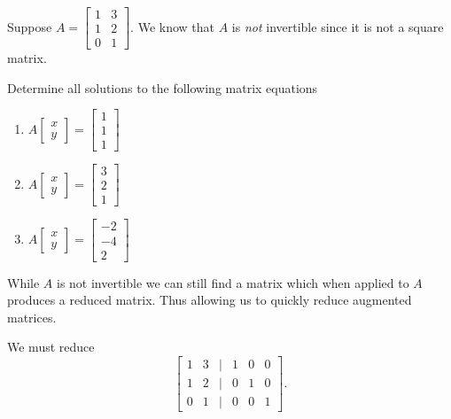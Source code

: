 \begin{example}
    Suppose \(A = \begin{bmatrix}
        1 & 3 \\
        1 & 2 \\
        0 & 1
    \end{bmatrix}.\) We know that \(A\) is \emph{not} invertible since it is not a square matrix.

    Determine all solutions to the following matrix equations
    \begin{enumerate}
        \item \(A \begin{bmatrix}
            x\\y
        \end{bmatrix} = \begin{bmatrix}
            1\\1 \\1
        \end{bmatrix}\)
        \item \(A\begin{bmatrix}
            x\\y
        \end{bmatrix} = \begin{bmatrix}
            3\\2\\1
        \end{bmatrix}\)
        \item \(A\begin{bmatrix}
            x\\y
        \end{bmatrix} = \begin{bmatrix}
            -2\\-4\\2
        \end{bmatrix}\)
    \end{enumerate}
    \begin{solution}
        While \(A\) is not invertible we can still find a matrix which when applied to \(A\) produces a reduced matrix. Thus allowing us to quickly reduce augmented matrices.

        We must reduce \[\begin{bmatrix}
            1 & 3 & \vert & 1 & 0 &0 \\
            1 & 2 & \vert & 0 & 1 & 0 \\
            0 & 1 & \vert & 0 & 0 & 1
        \end{bmatrix}.\]


\end{solution}
\end{example}
